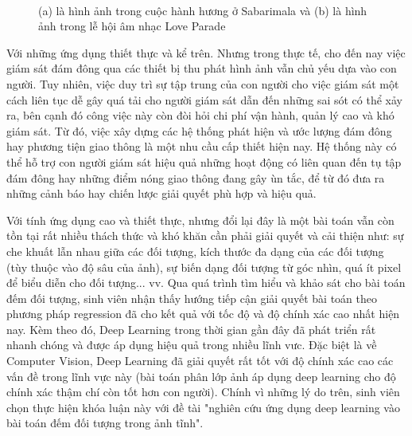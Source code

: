 \begin{figure}%
\centering
{}\qquad
{}\\
\caption{(a) là hình ảnh trong cuộc hành hương ở Sabarimala và (b) là hình ảnh trong lễ hội âm nhạc Love Parade}	
\label{2figs}
\end{figure}

	Với những ứng dụng thiết thực và kể trên. Nhưng trong thực tế, cho đến nay việc giám sát đám đông qua các thiết bị thu phát hình ảnh vẫn chủ yếu dựa vào con người. Tuy nhiên, việc duy trì sự tập trung của con người cho việc giám sát một cách liên tục dễ gây quá tải cho người giám sát dẫn đến những sai sót có thể xảy ra, bên cạnh đó công việc này còn đòi hỏi chi phí vận hành, quản lý cao và khó giám sát. Từ đó, việc xây dựng các hệ thống phát hiện và ước lượng đám đông hay phương tiện giao thông là một nhu cầu cấp thiết hiện nay. Hệ thống này có thể hỗ trợ con người giám sát hiệu quả những hoạt động có liên quan đến tụ tập đám đông hay những điểm nóng giao thông đang gây ùn tắc, để từ đó đưa ra những cảnh báo hay chiến lược giải quyết phù hợp và hiệu quả. \par 
	Với tính ứng dụng cao và thiết thực, nhưng đổi lại đây là một bài toán vẫn còn tồn tại rất nhiều thách thức và khó khăn cần phải giải quyết và cải thiện như: sự che khuất lẫn nhau giữa các đối tượng, kích thước đa dạng của các đối tượng (tùy thuộc vào độ sâu của ảnh), sự biến dạng đối tượng từ góc nhìn, quá ít pixel để biểu diễn cho đối tượng... vv. Qua quá trình tìm hiểu và khảo sát cho bài toán đếm đối tượng, sinh viên nhận thấy hướng tiếp cận giải quyết bài toán theo phương pháp regression đã cho kết quả với tốc độ và độ chính xác cao nhất hiện nay. Kèm theo đó, Deep Learning trong thời gian gần đây đã phát triển rất nhanh chóng và được áp dụng hiệu quả trong nhiều lĩnh vưc. Đặc biệt là về Computer Vision, Deep Learning đã giải quyết rất tốt với độ chính xác cao các vấn đề trong lĩnh vực này (bài toán phân lớp ảnh áp dụng deep learning cho độ chính xác thậm chí còn tốt hơn con người). Chính vì những lý do trên, sinh viên chọn thực hiện khóa luận này với đề tài "nghiên cứu ứng dụng deep learning vào bài toán đếm đối tượng trong ảnh tĩnh".  
